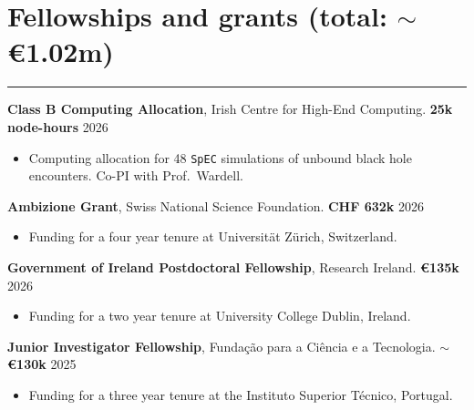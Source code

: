 \documentclass[10.5pt, oneside]{article}   	%
\begin{document}

{\color{Sectioncolour}
\section*{Fellowships and grants {\rm (total: $\sim$\euro{1.02m})}}
\vspace{-3mm}
\noindent\rule{\linewidth}{0.6pt}}


\textbf{Class B Computing Allocation}, Irish Centre for High-End Computing. \textbf{25k node-hours} \hfill 2026 \\
\vspace{-5mm}
\begin{itemize}
\item Computing allocation for 48 \texttt{SpEC} simulations of unbound black hole encounters. Co-PI with Prof.~Wardell.
\end{itemize}
\textbf{Ambizione Grant}, Swiss National Science Foundation. \textbf{CHF 632k} \hfill 2026 \\
\vspace{-5mm} 
\begin{itemize}
\item Funding for a four year tenure at Universität Zürich, Switzerland.
\end{itemize}
\textbf{Government of Ireland Postdoctoral Fellowship}, Research Ireland. \textbf{\euro{135k}} \hfill 2026 \\
\vspace{-5mm} 
\begin{itemize}
\item Funding for a two year tenure at University College Dublin, Ireland.
\end{itemize}
\textbf{Junior Investigator Fellowship}, Fundação para a Ciência e a Tecnologia. $\sim$\textbf{\euro{130k}} \hfill 2025 \\
\vspace{-5mm} 
\begin{itemize}
\item Funding for a three year tenure at the Instituto Superior Técnico, Portugal.
\end{itemize}
\end{document}
